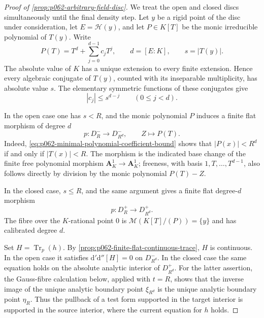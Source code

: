 \begin{proof}[Proof of \cref{prop:p062-arbitrary-field-disc}]
We treat the open and closed discs simultaneously until the final density
step.  Let \(y\) be a rigid point of the disc under consideration, let
\(E=\mathscr H(y)\), and let \(P\in K[T]\) be the monic irreducible
polynomial of \(T(y)\).  Write
\[
 P(T)=T^d+\sum_{j=0}^{d-1}c_jT^j,
 \qquad d=[E:K],
 \qquad s=|T(y)|.
\]
The absolute value of \(K\) has a unique extension to every finite
extension.  Hence every algebraic conjugate of \(T(y)\), counted with its
inseparable multiplicity, has absolute value \(s\).  The elementary
symmetric functions of these conjugates give
\begin{equation}\label{eq:p062-minimal-polynomial-coefficient-bound}
                         |c_j|\leq s^{d-j}
                         \qquad(0\leq j<d).
\end{equation}

In the open case one has \(s<R\), and the monic polynomial \(P\) induces
a finite flat morphism of degree \(d\)
\begin{equation}\label{eq:p062-open-polynomial-map}
 p\colon D_R^-\longrightarrow D_{R^d}^- ,
 \qquad Z\longmapsto P(T).
\end{equation}
Indeed, \eqref{eq:p062-minimal-polynomial-coefficient-bound} shows that
\(|P(x)|<R^d\) if and only if \(|T(x)|<R\).  The morphism is the indicated
base change of the finite free polynomial morphism
\(\mathbf A_K^1\to\mathbf A_K^1\); freeness, with basis
\(1,T,\ldots,T^{d-1}\), also follows directly by division by the monic
polynomial \(P(T)-Z\).

In the closed case, \(s\leq R\), and the same argument gives a finite flat
degree-\(d\) morphism
\begin{equation}\label{eq:p062-closed-polynomial-map}
 p\colon D_R^+\longrightarrow D_{R^d}^+ .
\end{equation}
The fibre over the \(K\)-rational point \(0\) is
\(
 \mathcal M(K[T]/(P))=\{y\}
\)
and has calibrated degree \(d\).

Set \(H=\operatorname{Tr}_p(h)\).  By
\cref{prop:p062-finite-flat-continuous-trace}, \(H\) is continuous.  In the
open case it satisfies
\(
 \mathrm d'\mathrm d''[H]=0
\)
on \(D_{R^d}^-\).  In the closed case the same equation holds on the
absolute analytic interior of \(D_{R^d}^+\).  For the latter assertion,
the Gauss-fibre calculation below, applied with \(t=R\), shows that the
inverse image of the unique analytic boundary point \(\xi_{R^d}\) is the
unique analytic boundary point \(\eta_R\).  Thus the pullback of a test form
supported in the target interior is supported in the source interior, where
the current equation for \(h\) holds.


\end{proof}
